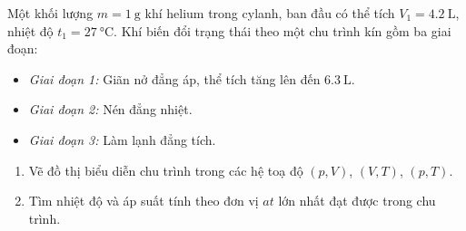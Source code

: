 \begin{ex}
Một khối lượng $m=\SI{1}{\gram}$ khí helium trong cylanh, ban đầu có thể tích $V_1=\SI{4.2}{\liter}$, nhiệt độ $t_1=\SI{27}{\celsius}$. Khí biến đổi trạng thái theo một chu trình kín gồm ba giai đoạn:
\begin{itemize}
	\item \textit{Giai đoạn 1:} Giãn nở đẳng áp, thể tích tăng lên đến $\SI{6.3}{\liter}$.
	\item \textit{Giai đoạn 2:} Nén đẳng nhiệt.
	\item \textit{Giai đoạn 3:} Làm lạnh đẳng tích.
\end{itemize}
\begin{enumerate}[label=\alph*)]
	\item Vẽ đồ thị biểu diễn chu trình trong các hệ toạ độ $\left(p, V\right)$, $\left(V, T\right)$, $\left(p, T\right)$.
	\item Tìm nhiệt độ và áp suất tính theo đơn vị $\si{at}$ lớn nhất đạt được trong chu trình.
\end{enumerate}
	

\end{ex}
